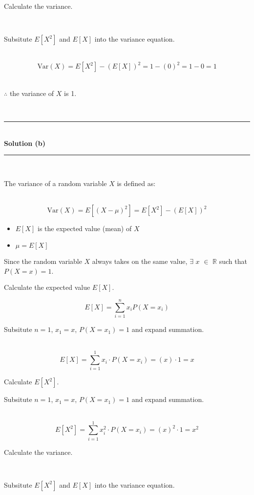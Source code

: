 \documentclass{article}
\begin{document}
\parbox{\textwidth}{Calculate the variance.}\\

\parbox{\textwidth}{Subsitute $E[X^2]$ and $E[X]$ into the variance equation.}\\

$$\text{Var}(X) = E[X^2] - (E[X])^2 = 1 - (0)^2 = 1 - 0 = 1$$\\

\parbox{\textwidth}{$\therefore$ the variance of $X$ is 1.}\\

\noindent\rule{\textwidth}{0.4pt}\\

\textbf{Solution (b)}

\noindent\rule{\textwidth}{0.4pt}\\

\parbox{\textwidth}{The variance of a random variable $X$ is defined as:}\\

$$\text{Var}(X) = E[(X - \mu)^2] = E[X^2] - (E[X])^2$$

\begin{itemize}
    \item $E[X]$ is the expected value (mean) of $X$
    \item $\mu = E[X]$
\end{itemize}

\parbox{\textwidth}{Since the random variable $X$ always takes on the same value, $\exists$ $x$ $\in$ $\mathbb{R}$ such that $P(X=x) =1$.}

\parbox{\textwidth}{Calculate the expected value $E[X]$.}

$$E[X] = \sum^{n}_{i=1} x_i P(X = x_i)$$

\parbox{\textwidth}{Subsitute $n=1$, $x_1=x$, $P(X = x_1) =1$ and expand summation.}\\

$$E[X] = \sum^1_{i=1} x_i \cdot P(X = x_i) = (x) \cdot 1 = x$$

\parbox{\textwidth}{Calculate $E[X^2]$.}

\parbox{\textwidth}{Subsitute $n=1$, $x_1=x$, $P(X = x_1) =1$ and expand summation.}\\

$$E[X^2] = \sum^1_{i=1} x_i^2 \cdot P(X = x_i) = (x)^2 \cdot 1 = x^2$$

\parbox{\textwidth}{Calculate the variance.}\\

\parbox{\textwidth}{Subsitute $E[X^2]$ and $E[X]$ into the variance equation.}\\
\end{document}
